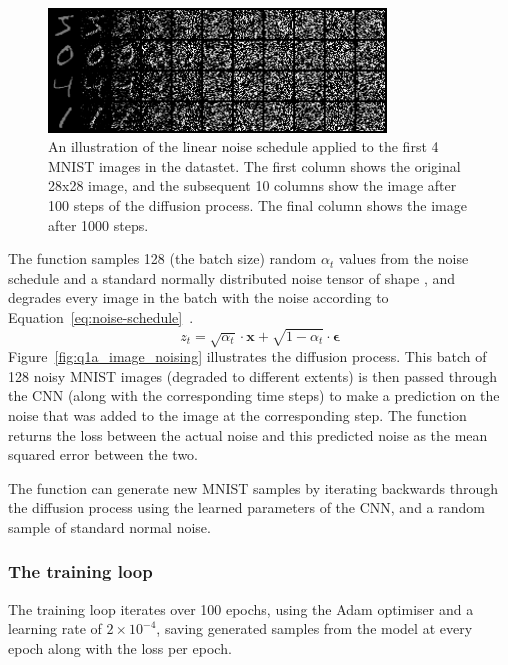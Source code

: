 \begin{figure}[thb]
    \centering
    \includegraphics[width=0.8\textwidth]{figures/q1a_image_noising}
    \caption{An illustration of the linear noise schedule applied to the first 4 MNIST images in the datastet.
        The first column shows the original 28x28 image, and the subsequent 10 columns show the image after 100 steps
        of the diffusion process.
        The final column shows the image after 1000 steps.}
    \label{fig:q1a_image_noising}
\end{figure}

The  function samples 128 (the batch size) random $\alpha_{t}$ values from the noise schedule and
a standard normally distributed noise tensor of shape , and degrades every image in the batch
with the noise according to Equation~\eqref{eq:noise-schedule}~\cite{prince}.
\begin{equation}\label{eq:noise-schedule}
    z_{t} = \sqrt{\alpha_{t}} \cdot \mathbf{x} + \sqrt{1 - \alpha_{t}} \cdot \mathbf{\epsilon}
\end{equation}
Figure~\eqref{fig:q1a_image_noising} illustrates the diffusion process.
This batch of 128 noisy MNIST images (degraded to different extents) is then passed through the CNN (along with the
corresponding time steps) to make a prediction on the noise that was added to the image at the corresponding step.
The function returns the loss between the actual noise and this predicted noise as the mean squared error between the
two.

The  function can generate new MNIST samples by iterating backwards through the diffusion process
using the learned parameters of the CNN, and a random sample of standard normal noise.

\subsubsection{The training loop}\label{subsubsec:training-loop}
The training loop iterates over 100 epochs, using the Adam optimiser and a learning rate of $2 \times 10^{-4}$,
saving generated samples from the model at every epoch along with the loss per epoch.
